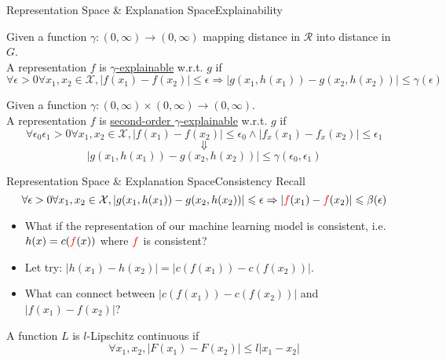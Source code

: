 \documentclass[10pt, aspectratio=169]{beamer}
\begin{document}
	\begin{frame}[t]{Representation Space \& Explanation Space}{Explainability}
		\begin{definition}
			Given a function $\gamma: (0, \infty)\to (0, \infty)$ mapping distance in $\mathcal{R}$ into distance in $G$.\\
			A representation $f$ is \underline{$\gamma$-explainable} w.r.t. $g$ if
			$$
			\forall\epsilon>0\forall x_1, x_2 \in \mathcal{X}, \left|f(x_1) - f(x_2)\right|\leqslant\epsilon \Rightarrow  \left|g(x_1, h(x_1)) - g(x_2,h(x_2))\right|\leqslant\gamma(\epsilon)
			$$
		\end{definition}
		
		\pause\begin{definition}
			Given a function $\gamma: (0, \infty)\times(0, \infty)\to (0, \infty)$.\\
			A representation $f$ is \underline{second-order $\gamma$-explainable} w.r.t. $g$ if
			$$
			\forall\epsilon_0\epsilon_1>0\forall x_1, x_2 \in \mathcal{X},
			\left|f(x_1) - f(x_2)\right|\leqslant\epsilon_0
			\wedge
			\left|f_x(x_1) - f_x(x_2)\right|\leqslant\epsilon_1$$
			$$
			\Downarrow
			$$
			$$
			\left|g(x_1, h(x_1)) - g(x_2,h(x_2))\right|\leqslant\gamma(\epsilon_0,\epsilon_1)
			$$
		\end{definition}
	\end{frame}
	\begin{frame}[t]{Representation Space \& Explanation Space}{Consistency Recall}
		$$
		\forall\epsilon>0\forall x_1, x_2 \in \mathcal{X}, \left|g(x_1, h(x_1)) - g(x_2,h(x_2))\right|\leqslant\epsilon \Rightarrow \left|\mathcolor{red}{f}(x_1) - \mathcolor{red}{f}(x_2)\right|\leqslant \beta(\epsilon)
		$$
		\begin{itemize}
			\item What if the representation of our machine learning model is consistent, i.e. $h(x)=c(\mathcolor{red}{f}(x))$ where $\mathcolor{red}{f}$ is consistent?
			
			\item Let try: $\left|h(x_1) - h(x_2)\right| = \left|c(f(x_1)) - c(f(x_2))\right|$.
			
			\item What can connect between $\left|c(f(x_1)) - c(f(x_2))\right|$ and $\left|f(x_1) - f(x_2)\right|$?
		\end{itemize}
		
		\begin{definition}
			A function $L$ is $l$-Lipschitz continuous if
			$$
			\forall x_1, x_2, \left|F(x_1)-F(x_2)\right|\leqslant l \left|x_1 - x_2\right|
			$$
		\end{definition}
	\end{frame}
\end{document}
